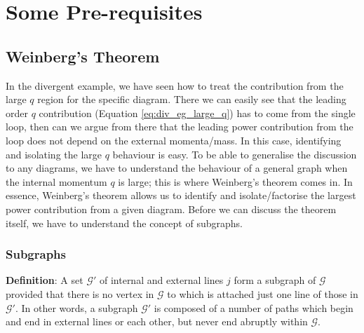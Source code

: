 \documentclass{article}
\begin{document}
\section{Some Pre-requisites} \label{prerequesites}
\subsection{Weinberg's Theorem}
In the divergent example, we have seen how to treat the contribution from the large $q$ region for the specific diagram. There we can easily see that the leading order $q$ contribution (Equation \ref{eq:div_eg_large_q}) has to come from the single loop, then can we argue from there that the leading power contribution from the loop does not depend on the external momenta/mass. In this case, identifying and isolating the large $q$ behaviour is easy. To be able to generalise the discussion to any diagrams, we have to understand the behaviour of a general graph when the internal momentum $q$ is large; this is where Weinberg's theorem \cite{weinberg} comes in. In essence, Weinberg's theorem allows us to identify and isolate/factorise the largest power contribution from a given diagram. Before we can discuss the theorem itself, we have to understand the concept of subgraphs.\\



\subsubsection{Subgraphs}
\textbf{Definition}: A set $\mathcal{G'}$ of internal and external lines $j$ form a subgraph of $\mathcal{G}$ provided that there is no vertex in $\mathcal{G}$ to which is attached just one line of those in $\mathcal{G'}$. In other words, a subgraph $\mathcal{G'}$ is composed of a number of paths which begin and end in external lines or each other, but never end abruptly within $\mathcal{G}$. 
\end{document}
